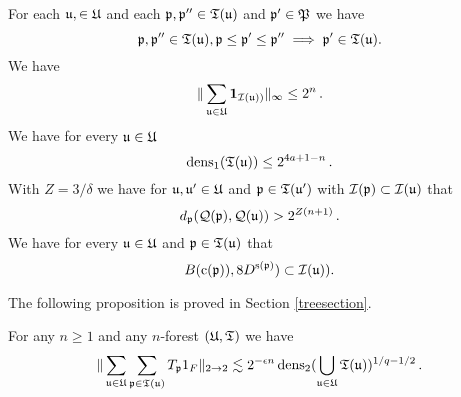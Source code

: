 For each $\mathfrak u, \in \mathfrak U$ and each $\mathfrak p,\mathfrak p''\in \mathfrak T(\mathfrak u)$ and $\mathfrak p'\in \mathfrak P$
we have
\begin{equation}\label{forest2}
    \mathfrak p, \mathfrak p'' \in \mathfrak{T}(\mathfrak u), \mathfrak p \leq \mathfrak p' \leq \mathfrak p'' \implies \mathfrak p' \in \mathfrak{T}(\mathfrak u).
\end{equation}
We have
\begin{equation}\label{forest3}
   \|\sum_{\mathfrak u\in \mathfrak U} \mathbf{1}_{\mathcal{I}(\mathfrak u))}\|_\infty \leq 2^n\,.
\end{equation}
We have for every $\mathfrak u\in \mathfrak U$
\begin{equation}\label{forest4}
\operatorname{\operatorname{dens}}_1(\mathfrak T(\mathfrak u))\le 2^{4a + 1-n}\, .
\end{equation}
With $Z=3/\delta$ we have for $\mathfrak u, \mathfrak u'\in \mathfrak U$ and $\mathfrak p\in \mathfrak T(\mathfrak u')$ with $\mathcal{I}(\mathfrak p)\subset \mathcal{I}(\mathfrak u)$ that
\begin{equation}\label{forest5}
d_{\mathfrak p}(\mathcal{Q}(\mathfrak p), \mathcal{Q}(\mathfrak u))>2^{Z(n+1)}\, .
\end{equation}
We have for every $\mathfrak u\in \mathfrak U$ and $\mathfrak p\in \mathfrak T(\mathfrak u)$ that
\begin{equation}\label{forest6}
B(\mathrm{c}(\mathfrak p)), 8D^{\mathrm{s}(\mathfrak p)})\subset \mathcal{I}(\mathfrak u)).
\end{equation}








The following proposition is proved in Section \ref{treesection}.
\begin{prop}\label{forestprop}
For any $n\ge 1$ and any $n$-forest $(\mathfrak U,\mathfrak T)$ we have
$$\|\sum_{\mathfrak u\in \mathfrak U}
\sum_{\mathfrak p\in \mathfrak T(\mathfrak u)} T_{\mathfrak p} 1_F\|_{2\to 2}
\lesssim 2^{-\epsilon n}
\operatorname{\operatorname{dens}}_2(\bigcup_{\mathfrak u\in \mathfrak U}\mathfrak T(\mathfrak u))^{1/q-1/2} \, .$$
\end{prop}

